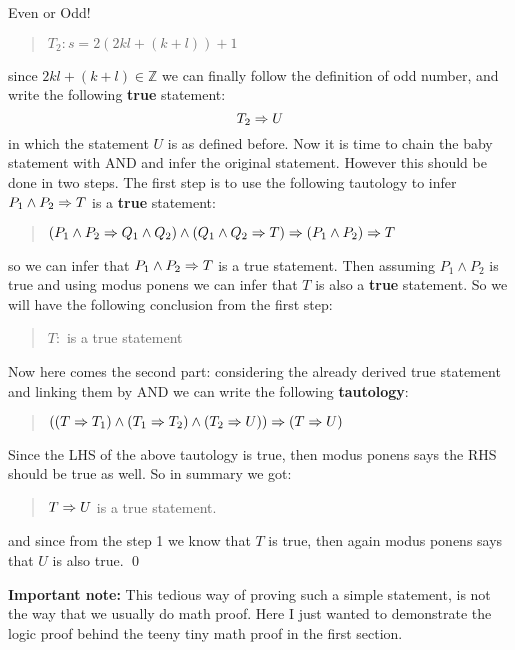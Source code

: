 \begin{example}{Even or Odd!}
\begin{quote}
		$ T_2: s =  2(2kl + (k+l)) + 1 $
	\end{quote}
	since $ 2kl + (k+l) \in \mathbb{Z} $ we can finally follow the definition of odd number, and write the following \textbf{true} statement:
	\[ T_2 \Rightarrow U \]
	in which the statement $ U $ is as defined before. Now it is time to chain the baby statement with AND and infer the original statement. However this should be done in two steps. The first step is to use the following tautology to infer $ P_1 \wedge P_2 \Rightarrow T $ is a \textbf{true} statement:
	\begin{quote}
		\centering
		$ (P_1 \wedge P_2 \Rightarrow Q_1 \wedge Q_2) \wedge (Q_1 \wedge Q_2 \Rightarrow T) \Rightarrow (P_1 \wedge P_2) \Rightarrow T $
	\end{quote}
	so we can infer that $ P_1 \wedge P_2 \Rightarrow T $ is a true statement. Then assuming $ P_1 \wedge P_2 $ is  true and using modus ponens we can infer that $ T $ is also a \textbf{true} statement. So we will have the following conclusion from the first step:
	\begin{quote}
		\centering
		$ T: $ is a true statement
	\end{quote}
	Now here comes the second part: considering the already derived true statement and linking them by AND we can write the following \textbf{tautology}:
	\begin{quote}
		\centering
		$ ((T \Rightarrow T_1) \wedge (T_1 \Rightarrow T_2) \wedge (T_2 \Rightarrow U)) \Rightarrow (T \Rightarrow U) $ 
	\end{quote}
	Since the LHS of the above tautology is true, then modus ponens says the RHS should be true as well. So in summary we got:
	\begin{quote}
		\centering
		$ T \Rightarrow U $ is a true statement.
	\end{quote}
	and since from the step 1 we know that $ T $ is true, then again modus ponens says that $ U $ is also true. \qed
	\newline
	
	\textbf{Important note:} This tedious way of proving such a simple statement, is not the way that we usually do math proof. Here I just wanted to demonstrate the logic proof behind the teeny tiny math proof in the first section. \\
	

\end{example}
